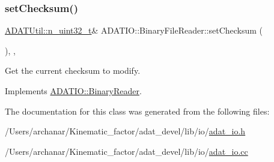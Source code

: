 \subsubsection{\texorpdfstring{setChecksum()}{setChecksum()}\hspace{0.1cm}{\footnotesize\ttfamily [2/2]}}
{\footnotesize\ttfamily \mbox{\hyperlink{namespaceADATUtil_ad945a8afa4db2d1f89b731964adae97e}{A\+D\+A\+T\+Util\+::n\+\_\+uint32\+\_\+t}}\& A\+D\+A\+T\+I\+O\+::\+Binary\+File\+Reader\+::set\+Checksum (\begin{DoxyParamCaption}{ }\end{DoxyParamCaption})\hspace{0.3cm}{\ttfamily [inline]}, {\ttfamily [protected]}, {\ttfamily [virtual]}}



Get the current checksum to modify. 



Implements \mbox{\hyperlink{classADATIO_1_1BinaryReader_a33d291f073bf2e1f71f6bdbe40ce343a}{A\+D\+A\+T\+I\+O\+::\+Binary\+Reader}}.



The documentation for this class was generated from the following files\+:\begin{DoxyCompactItemize}
\item 
/\+Users/archanar/\+Kinematic\+\_\+factor/adat\+\_\+devel/lib/io/\mbox{\hyperlink{lib_2io_2adat__io_8h}{adat\+\_\+io.\+h}}\item 
/\+Users/archanar/\+Kinematic\+\_\+factor/adat\+\_\+devel/lib/io/\mbox{\hyperlink{adat__io_8cc}{adat\+\_\+io.\+cc}}\end{DoxyCompactItemize}
